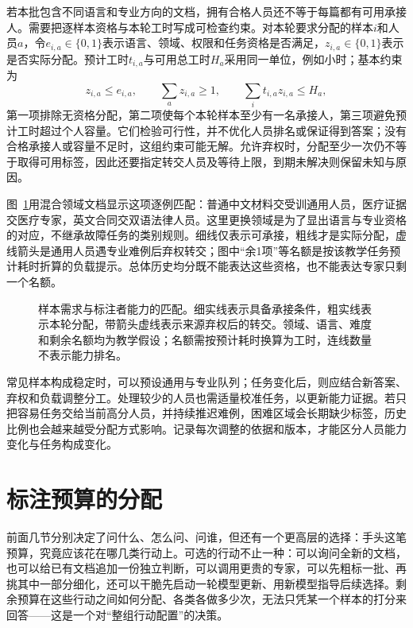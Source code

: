 若本批包含不同语言和专业方向的文档，拥有合格人员还不等于每篇都有可用承接人。需要把逐样本资格与本轮工时写成可检查约束。对本轮要求分配的样本$i$和人员$a$，令$e_{i,a}\in\{0,1\}$表示语言、领域、权限和任务资格是否满足，$z_{i,a}\in\{0,1\}$表示是否实际分配。预计工时$t_{i,a}$与可用总工时$H_a$采用同一单位，例如小时；基本约束为
\begin{equation}
  z_{i,a}\leq e_{i,a},
  \qquad
  \sum_a z_{i,a}\geq1,
  \qquad
  \sum_i t_{i,a}z_{i,a}\leq H_a,
  \label{eq:knowledge-acquisition-human-assignment}
\end{equation}
第一项排除无资格分配，第二项使每个本轮样本至少有一名承接人，第三项避免预计工时超过个人容量。它们检验可行性，并不优化人员排名或保证得到答案；没有合格承接人或容量不足时，这组约束可能无解。允许弃权时，分配至少一次仍不等于取得可用标签，因此还要指定转交人员及等待上限，到期未解决则保留未知与原因。

图~\ref{fig:knowledge-acquisition-human-matching}用混合领域文档显示这项逐例匹配：普通中文材料交受训通用人员，医疗证据交医疗专家，英文合同交双语法律人员。这里更换领域是为了显出语言与专业资格的对应，不继承故障任务的类别规则。细线仅表示可承接，粗线才是实际分配，虚线箭头是通用人员遇专业难例后弃权转交；图中“余1项”等名额是按该教学任务预计耗时折算的负载提示。总体历史均分既不能表达这些资格，也不能表达专家只剩一个名额。

\begin{figure}[htbp]
  \centering
  
  \caption{样本需求与标注者能力的匹配。细实线表示具备承接条件，粗实线表示本轮分配，带箭头虚线表示来源弃权后的转交。领域、语言、难度和剩余名额均为教学假设；名额需按预计耗时换算为工时，连线数量不表示能力排名。}
  \label{fig:knowledge-acquisition-human-matching}
\end{figure}

常见样本构成稳定时，可以预设通用与专业队列；任务变化后，则应结合新答案、弃权和负载调整分工。处理较少的人员也需适量校准任务，以更新能力证据。若只把容易任务交给当前高分人员，并持续推迟难例，困难区域会长期缺少标签，历史比例也会越来越受分配方式影响。记录每次调整的依据和版本，才能区分人员能力变化与任务构成变化。

\section{标注预算的分配}
\label{sec:knowledge-acquisition-human-budget}

前面几节分别决定了问什么、怎么问、问谁，但还有一个更高层的选择：手头这笔预算，究竟应该花在哪几类行动上。可选的行动不止一种：可以询问全新的文档，也可以给已有文档追加一份独立判断，可以调用更贵的专家，可以先粗标一批、再挑其中一部分细化，还可以干脆先启动一轮模型更新、用新模型指导后续选择。剩余预算在这些行动之间如何分配、各类各做多少次，无法只凭某一个样本的打分来回答——这是一个对“整组行动配置”的决策。

